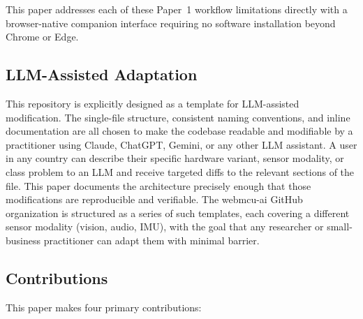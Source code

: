 \documentclass[11pt]{article}
\begin{document}
This paper addresses each of these Paper~1 workflow limitations directly with a
browser-native companion interface requiring no software installation beyond Chrome
or Edge.

\subsection{LLM-Assisted Adaptation}

This repository is explicitly designed as a template for LLM-assisted modification.
The single-file structure, consistent naming conventions, and inline documentation
are all chosen to make the codebase readable and modifiable by a practitioner using
Claude, ChatGPT, Gemini, or any other LLM assistant. A user in any country can
describe their specific hardware variant, sensor modality, or class problem to an LLM
and receive targeted diffs to the relevant sections of the file. This paper documents
the architecture precisely enough that those modifications are reproducible and
verifiable. The webmcu-ai GitHub organization is structured as a series of such
templates, each covering a different sensor modality (vision, audio, IMU), with the
goal that any researcher or small-business practitioner can adapt them with minimal
barrier.

\subsection{Contributions}

This paper makes four primary contributions:
\end{document}
